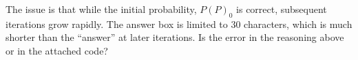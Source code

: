 \documentclass{article}
\begin{document}
The issue is that while the initial probability, $P(P)_0$ is correct, subsequent iterations grow rapidly.  The answer box is limited to 30 characters, which is much shorter than the ``answer'' at later iterations.  Is the error in the reasoning above or in the attached code?

\inputminted[]{python}{prob329.py}
\end{document}
